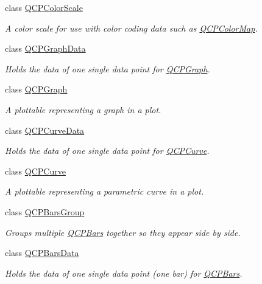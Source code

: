 \begin{DoxyCompactItemize}
\item 
class \hyperlink{class_q_c_p_color_scale}{Q\+C\+P\+Color\+Scale}
\begin{DoxyCompactList}\small\item\em A color scale for use with color coding data such as \hyperlink{class_q_c_p_color_map}{Q\+C\+P\+Color\+Map}. \end{DoxyCompactList}\item 
class \hyperlink{class_q_c_p_graph_data}{Q\+C\+P\+Graph\+Data}
\begin{DoxyCompactList}\small\item\em Holds the data of one single data point for \hyperlink{class_q_c_p_graph}{Q\+C\+P\+Graph}. \end{DoxyCompactList}\item 
class \hyperlink{class_q_c_p_graph}{Q\+C\+P\+Graph}
\begin{DoxyCompactList}\small\item\em A plottable representing a graph in a plot. \end{DoxyCompactList}\item 
class \hyperlink{class_q_c_p_curve_data}{Q\+C\+P\+Curve\+Data}
\begin{DoxyCompactList}\small\item\em Holds the data of one single data point for \hyperlink{class_q_c_p_curve}{Q\+C\+P\+Curve}. \end{DoxyCompactList}\item 
class \hyperlink{class_q_c_p_curve}{Q\+C\+P\+Curve}
\begin{DoxyCompactList}\small\item\em A plottable representing a parametric curve in a plot. \end{DoxyCompactList}\item 
class \hyperlink{class_q_c_p_bars_group}{Q\+C\+P\+Bars\+Group}
\begin{DoxyCompactList}\small\item\em Groups multiple \hyperlink{class_q_c_p_bars}{Q\+C\+P\+Bars} together so they appear side by side. \end{DoxyCompactList}\item 
class \hyperlink{class_q_c_p_bars_data}{Q\+C\+P\+Bars\+Data}
\begin{DoxyCompactList}\small\item\em Holds the data of one single data point (one bar) for \hyperlink{class_q_c_p_bars}{Q\+C\+P\+Bars}. \end{DoxyCompactList}\item 

\end{DoxyCompactItemize}
